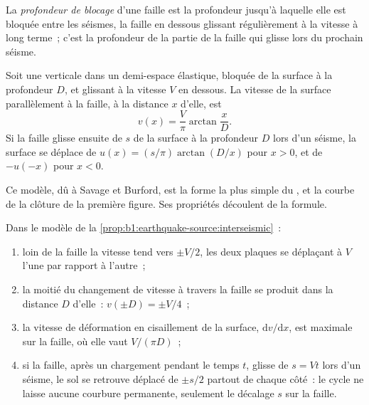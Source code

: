 \begin{definition}\label{def:b1:earthquake-source:locking-depth}
La \emph{profondeur de blocage} d'une faille est la profondeur jusqu'à
laquelle elle est bloquée entre les séismes, la faille en dessous glissant régulièrement à la
vitesse à long terme~; c'est la profondeur de la partie de la faille qui glisse lors du prochain
séisme.
\end{definition}

\begin{proposition}\label{prop:b1:earthquake-source:interseismic}
Soit une  verticale dans un demi-espace élastique, bloquée de la
surface à la profondeur $D$, et glissant à la vitesse $V$ en dessous. La vitesse de
la surface parallèlement à la faille, à la distance $x$ d'elle, est
\[
  v(x) = \frac{V}{\pi}\arctan\frac{x}{D} .
\]
Si la faille glisse ensuite de $s$ de la surface à la profondeur $D$ lors d'un
séisme, la surface se déplace de $u(x) = (s/\pi)\arctan(D/x)$ pour $x > 0$, et de
$-u(-x)$ pour $x < 0$.
\end{proposition}
\admitted

Ce modèle, dû à Savage et Burford, est la forme la plus simple du , et la courbe de la clôture de la première figure. Ses propriétés découlent
de la formule.

\begin{proposition}\label{prop:b1:earthquake-source:profile}
Dans le modèle de la \cref{prop:b1:earthquake-source:interseismic}~:
\begin{enumerate}[label=(\alph*)]
  \item loin de la faille la vitesse tend vers $\pm V/2$, les deux plaques
        se déplaçant à $V$ l'une par rapport à l'autre~;
  \item la moitié du changement de vitesse à travers la faille se produit dans la
        distance $D$ d'elle~: $v(\pm D) = \pm V/4$~;
  \item la vitesse de déformation en cisaillement de la surface, $\mathrm dv/\mathrm dx$, est
        maximale sur la faille, où elle vaut $V/(\pi D)$~;
  \item si la faille, après un chargement pendant le temps $t$, glisse de $s = Vt$ lors d'un
        séisme, le sol se retrouve déplacé de $\pm s/2$ partout de
        chaque côté~: le cycle ne laisse aucune courbure permanente, seulement le décalage $s$
        sur la faille.
\end{enumerate}
\end{proposition}

